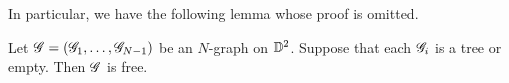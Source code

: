 In particular, we have the following lemma whose proof is omitted.
\begin{lemma}\label{lemma:tree Ngraphs are free}
Let $\mathscr{G}=(\mathscr{G}_1,\dots,\mathscr{G}_{N-1})$ be an $N$-graph on $\mathbb{D}^2$. Suppose that each $\mathscr{G}_i$ is a tree or empty. Then $\mathscr{G}$ is free.
\end{lemma}
\begin{comment}
\begin{proof}
Recall from Definition~\ref{def:free} that an $3$-graph $\ngraph(a,b,c)$ is free if the Legendrian weave $\Legendrian(\ngraph(a,b,c))$ can be woven without Reeb chords. 
To investigate the Reeb chords of $\Legendrian(\ngraph(a,b,c))$ in $J^1\disk^2$,
let us consider the wavefront $\wavefront(\ngraph(a,b,c))$ in $\disk^2\times \R$.
Label the sheets of the wavefront 
\begin{equation}\label{equation:wavefront decomposition}
\wavefront(\ngraph(a,b,c))=\bigcup_{i=1}^{3}\wavefront_i
\end{equation}
by the $z$-coordinate from bottom to top. Let $f_i:\disk^2\to \R$ be a function whose graph becomes $\wavefront_i$, and let $h_{ij}:\disk^2\to \R$ be a difference function given by $f_j-f_i$ for any $1\le i<j\le 3$.
By the construction $h_{i\, i+1}^{-1}(0)$ gives the subgraph $\ngraph_i(a,b,c)$ of $\ngraph(a,b,c)=(\ngraph_1, \ngraph_2)$. 
The critical points of $h_{ij}$ on $\mathring{\disk}^2\setminus \ngraph(a,b,c)$ are the possible candidates for the Reeb chords. 
In other words, to guarantee that $\ngraph(a,b,c)$ is free, it suffices to show that $h_{ij}$ has no critical point on $\mathring{\disk}^2\setminus \ngraph(a,b,c)$. 

Let us analyze local configurations of gradients $\nabla h_{12}$, $\nabla h_{23}$.
\begin{enumerate}
\item Near the edge of $N$-graphs, the followings are examples of local configuration of $\nabla h_{12}$, $\nabla h_{23}$ depending on slope of Legendrian sheets. 
\[
\begin{tikzpicture}
\begin{scope}
\draw[thick] \boundellipse{0,1}{1.25}{0.25};

\draw[blue, thick] (-1,0)--(1,0);
\draw[thick] (-3/4,1/3)--(5/4,1/3);
\draw[thick] (5/4,1/3)--(3/4,-1/3);
\draw[thick] (3/4,-1/3)--(-5/4,-1/3);
\draw[thick] (-5/4,-1/3)--(-3/4,1/3);
\draw[thick] (-5/4,3/12)--(3/4,3/12);
\draw[thick] (3/4,3/12)--(5/4,-3/12);
\draw[thick] (5/4,-3/12)--(-3/4,-3/12);
\draw[thick] (-3/4,-3/12)--(-5/4,3/12);


\end{comment}
